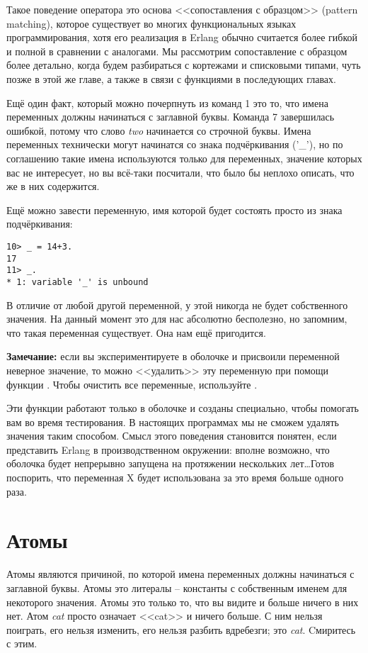 Такое поведение оператора \ops{\strut=} это основа <<сопоставления с образцом>> (pattern matching), которое существует во многих функциональных языках программирования, хотя его реализация в Erlang обычно считается более гибкой и полной в сравнении с аналогами.
Мы рассмотрим сопоставление с образцом более детально, когда будем разбираться с кортежами и списковыми типами, чуть позже в этой же главе, а также в связи с функциями в последующих главах.

Ещё один факт, который можно почерпнуть из команд 1 это то, что имена переменных должны начинаться с заглавной буквы.
Команда 7 завершилась ошибкой, потому что слово \emph{two} начинается со строчной буквы.
Имена переменных технически могут начинатся со знака подчёркивания ('\_'), но по соглашению такие имена используются только для переменных, значение которых вас не интересует, но вы всё\--таки посчитали, что было бы неплохо описать, что же в них содержится.

Ещё можно завести переменную, имя которой будет состоять просто из знака подчёркивания:
\begin{lstlisting}[style=repl]
10> _ = 14+3.
17
11> _.
* 1: variable '_' is unbound
\end{lstlisting}

В отличие от любой другой переменной, у этой никогда не будет собственного значения.
На данный момент это для нас абсолютно бесполезно, но запомним, что такая переменная существует.
Она нам ещё пригодится.\\ 
\colorbox{lgray}
{
\begin{minipage}{1.0\linewidth}
\textbf{Замечание:} если вы экспериментируете в оболочке и присвоили переменной неверное значение, то можно <<удалить>> эту переменную при помощи функции .
Чтобы очистить все переменные, используйте .
\par 
Эти функции работают только в оболочке и созданы специально, чтобы помогать вам во время тестирования.
В настоящих программах мы не сможем удалять значения таким способом.
Смысл этого поведения становится понятен, если представить Erlang в производственном окружении: вполне возможно, что оболочка будет непрерывно запущена на протяжении нескольких лет\ldots Готов поспорить, что переменная X будет использована за это время больше одного раза.
\end{minipage}
}
\section{Атомы}\label{atoms}
Атомы являются причиной, по которой имена переменных должны начинаться с заглавной буквы.
Атомы это литералы \--- константы с собственным именем для некоторого значения.
Атомы это только то, что вы видите и больше ничего в них нет.
Атом \emph{cat} просто означает <<cat>> и ничего больше.
С ним нельзя поиграть, его нельзя изменить, его нельзя разбить вдребезги; это \emph{cat}.
Cмиритесь с этим.

